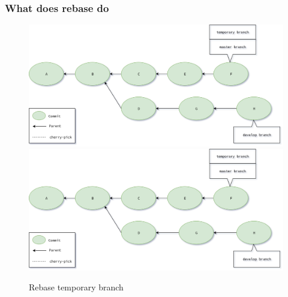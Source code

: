 \begin{frame}
    \frametitle{What does rebase do}
    \addtocounter{page}{-1}
    \begin{figure}
        \begin{center}
            {
                \includegraphics[width=1\textwidth,keepaspectratio]{./images/Rebase_TempBranch.png}
            }
            {
                \includegraphics[height=0.75\textheight,keepaspectratio]{./images/Rebase_TempBranch.png}
            }
            \caption{Rebase temporary branch}
        \end{center}
    \end{figure}
\end{frame}


